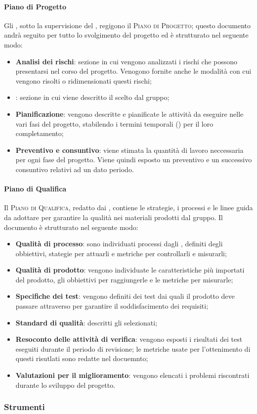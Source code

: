 \documentclass[../norme-di-progetto.tex]{subfiles}
\begin{document}
\paragraph{Piano di Progetto}
Gli \emph{}, sotto la supervisione del , regigono il \textsc{Piano di Progetto}; questo documento andrà seguito per tutto lo svolgimento del progetto ed è strutturato nel seguente modo:
\begin{itemize}
    \item \textbf{Analisi dei rischi}: sezione in cui vengono analizzati i rischi che possono presentarsi nel corso del progetto. Venogono fornite anche le modalità con cui vengono risolti o ridimensionati questi rischi;
    \item {}: sezione in cui viene descritto il  scelto dal gruppo;
    \item \textbf{Pianificazione}: vengono descritte e pianificate le attività da eseguire nelle vari fasi del progetto, stabilendo i termini temporali () per il loro completamento;
    \item \textbf{Preventivo e consuntivo}: viene stimata la quantità di lavoro neccessaria per ogni fase del progetto. Viene quindi esposto un preventivo e un successivo consuntivo relativi ad un dato periodo.
\end{itemize}

\paragraph{Piano di Qualifica}
Il \textsc{Piano di Qualifica}, redatto dai , contiene le strategie, i processi e le linee guida da adottare per garantire la qualità nei materiali prodotti dal gruppo.
Il documento è strutturato nel seguente modo:
\begin{itemize}
    \item \textbf{Qualità di processo}: sono individuati processi dagli , definiti degli obbiettivi, stategie per attuarli e metriche per controllarli e misurarli;
    \item \textbf{Qualità di prodotto}: vengono individuate le caratteristiche più importati del prodotto, gli obbiettivi per raggiungerle e le metriche per misurarle;
    \item \textbf{Specifiche dei test}: vengono definiti dei test dai quali il prodotto deve passare attraverso per garantire il soddisfacimento dei requisiti;
    \item \textbf{Standard di qualità}: descritti gli  selezionati;
    \item \textbf{Resoconto delle attività di verifica}: vengono esposti i risultati dei test eseguiti durante il periodo di revisione; le metriche usate per l'ottenimento di questi risutlati sono redatte nel docuemnto;
    \item \textbf{Valutazioni per il miglioramento}: vengono elencati i problemi riscontrati durante lo sviluppo del progetto.
\end{itemize} 

\subsubsection{Strumenti}
\end{document}
